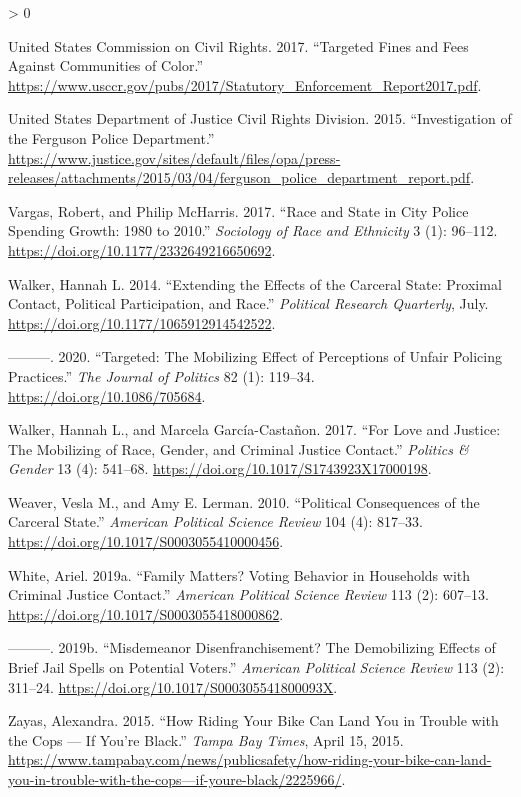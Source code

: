 \documentclass[
  12pt,
]{article}
\newlength{\cslhangindent}
\newenvironment{CSLReferences}[2] %
 {%
  \setlength{\parindent}{0pt}
  \ifodd #1 \everypar{\setlength{\hangindent}{\cslhangindent}}\ignorespaces\fi
  \ifnum #2 > 0
  \setlength{\parskip}{#2\baselineskip}
  \fi
 }%
 {}
\begin{document}
\begin{CSLReferences}{1}{0}
\leavevmode\hypertarget{ref-UnitedStatesCommissiononCivilRights2017}{}%
United States Commission on Civil Rights. 2017. {``Targeted {Fines} and {Fees Against Communities} of {Color}.''} \url{https://www.usccr.gov/pubs/2017/Statutory_Enforcement_Report2017.pdf}.

\leavevmode\hypertarget{ref-UnitedStatesDepartmentofJusticeCivilRightsDivision2015}{}%
United States Department of Justice Civil Rights Division. 2015. {``Investigation of the {Ferguson Police Department}.''} \url{https://www.justice.gov/sites/default/files/opa/press-releases/attachments/2015/03/04/ferguson_police_department_report.pdf}.

\leavevmode\hypertarget{ref-Vargas2017a}{}%
Vargas, Robert, and Philip McHarris. 2017. {``Race and {State} in {City Police Spending Growth}: 1980 to 2010.''} \emph{Sociology of Race and Ethnicity} 3 (1): 96--112. \url{https://doi.org/10.1177/2332649216650692}.

\leavevmode\hypertarget{ref-Walker2014}{}%
Walker, Hannah L. 2014. {``Extending the {Effects} of the {Carceral State}: {Proximal Contact}, {Political Participation}, and {Race}.''} \emph{Political Research Quarterly}, July. \url{https://doi.org/10.1177/1065912914542522}.

\leavevmode\hypertarget{ref-Walker2020}{}%
---------. 2020. {``Targeted: {The Mobilizing Effect} of {Perceptions} of {Unfair Policing Practices}.''} \emph{The Journal of Politics} 82 (1): 119--34. \url{https://doi.org/10.1086/705684}.

\leavevmode\hypertarget{ref-Walker2017}{}%
Walker, Hannah L., and Marcela García-Castañon. 2017. {``For {Love} and {Justice}: {The Mobilizing} of {Race}, {Gender}, and {Criminal Justice Contact}.''} \emph{Politics \& Gender} 13 (4): 541--68. \url{https://doi.org/10.1017/S1743923X17000198}.

\leavevmode\hypertarget{ref-Weaver2010}{}%
Weaver, Vesla M., and Amy E. Lerman. 2010. {``Political {Consequences} of the {Carceral State}.''} \emph{American Political Science Review} 104 (4): 817--33. \url{https://doi.org/10.1017/S0003055410000456}.

\leavevmode\hypertarget{ref-White2019}{}%
White, Ariel. 2019a. {``Family {Matters}? {Voting Behavior} in {Households} with {Criminal Justice Contact}.''} \emph{American Political Science Review} 113 (2): 607--13. \url{https://doi.org/10.1017/S0003055418000862}.

\leavevmode\hypertarget{ref-White2019a}{}%
---------. 2019b. {``Misdemeanor {Disenfranchisement}? {The Demobilizing Effects} of {Brief Jail Spells} on {Potential Voters}.''} \emph{American Political Science Review} 113 (2): 311--24. \url{https://doi.org/10.1017/S000305541800093X}.

\leavevmode\hypertarget{ref-Zayas2015}{}%
Zayas, Alexandra. 2015. {``How Riding Your Bike Can Land You in Trouble with the Cops --- If You're Black.''} \emph{Tampa Bay Times}, April 15, 2015. \url{https://www.tampabay.com/news/publicsafety/how-riding-your-bike-can-land-you-in-trouble-with-the-cops—if-youre-black/2225966/}.

\end{CSLReferences}
\end{document}
